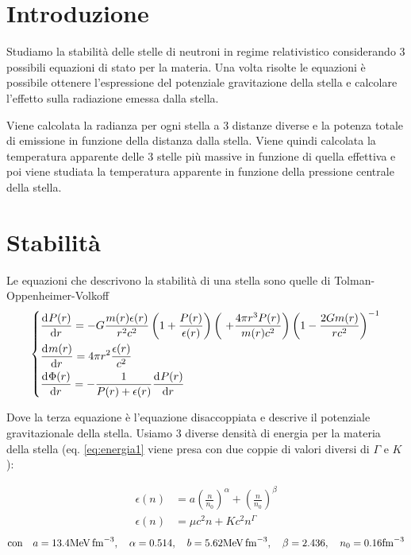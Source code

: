 \documentclass[a4paper, titlepage]{article}
\begin{document}
\section{Introduzione}
Studiamo la stabilità delle stelle di neutroni in regime relativistico considerando 3 possibili equazioni di stato per la materia.
Una volta risolte le equazioni è possibile ottenere l'espressione del potenziale gravitazione della stella e calcolare l'effetto sulla radiazione emessa dalla stella.


Viene calcolata la radianza per ogni stella a 3 distanze diverse e la potenza totale di emissione in funzione della distanza dalla stella.
Viene quindi calcolata la temperatura apparente delle 3 stelle più massive in funzione di quella effettiva e poi viene studiata la temperatura apparente in funzione della pressione centrale della stella.

\section{Stabilità}

Le equazioni che descrivono la stabilità di una stella sono quelle di Tolman-Oppenheimer-Volkoff
\begin{equation}
    \begin{dcases}
        \dv[]{P(r)}{r} = - G \frac{m(r) \epsilon (r)}{r^2 c^2} \left(1 + \frac{P(r)}{\epsilon (r)} \right) \left(\ + \frac{4 \pi r^3 P(r)}{m(r) c^2} \right) \left(1 - \frac{2 G m(r)}{r c^2} \right)^{-1} \\
        \dv[]{m(r)}{r} = 4 \pi r^2 \frac{\epsilon (r)}{c^2} \\
        \dv[]{\Phi(r)}{r} = - \frac{1}{P(r) + \epsilon (r)} \dv[]{P(r)}{r}
    \end{dcases}
    \label{eq:sistema_corr}
\end{equation}

Dove la terza equazione è l'equazione disaccoppiata e descrive il potenziale gravitazionale della stella.
Usiamo 3 diverse densità di energia per la materia della stella (eq. \ref{eq:energia1} viene presa con due coppie di valori diversi di $\Gamma$ e $K$):

\begin{align}
    \epsilon (n) &= a \left( \frac{n}{n_0} \right) ^{\alpha} + \left( \frac{n}{n_0} \right) ^{\beta} \\
    \epsilon (n) &= \mu c^2n+Kc^2n^\Gamma
    \label{eq:energia1}
\end{align}
\begin{equation}
    \text{con} \quad a = 13.4 \unit{\mega\electronvolt\per\femto\cubic\meter}, \quad
    \alpha = 0.514, \quad
    b = 5.62 \unit{\mega\electronvolt\per\femto\cubic\meter}, \quad
    \beta = 2.436, \quad
    n_0 = 0.16 \unit{\per\femto\cubic\meter} \\
\end{equation}
\end{document}
